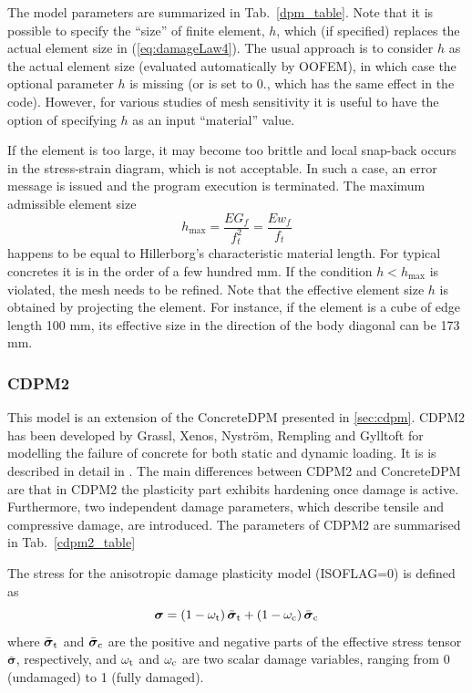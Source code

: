 \documentclass[a4paper]{article}
\begin{document}
The model parameters are summarized
in Tab.~\ref{dpm_table}. Note that it is possible to specify the ``size'' of finite element, $h$, which (if specified) replaces
the actual element size in  (\ref{eq:damageLaw4}). The usual approach is to consider $h$ as the actual element size (evaluated automatically by OOFEM), 
in which case the optional
parameter $h$ is missing (or is set to 0., which has the same effect in the code). However, for various studies of mesh sensitivity
it is useful to have the option of  specifying $h$ as an input ``material'' value.

If the element is too large, it may become too brittle and local snap-back
occurs in the stress-strain diagram, which is not acceptable. 
In such a case, an error message is issued and the program execution
is terminated. The maximum admissible element size 
\begin{equation}
h_{\max} = \frac{EG_f}{f_t^2} = \frac{Ew_f}{f_t}
\end{equation}
happens to be equal to Hillerborg's characteristic material length. 
For typical concretes it is in the order of a few hundred mm. 
If the condition $h<h_{\max}$ is violated, the mesh needs to be refined.
Note that the effective element size $h$ is obtained by projecting the element.
For instance, if the element is a cube of edge length 100 mm, its effective
size in the direction of the body diagonal can be 173 mm. 

\subsubsection{CDPM2}

This model is an extension of the ConcreteDPM presented in \ref{sec:cdpm}.
CDPM2 has been developed by Grassl, Xenos, Nystr\"{o}m, Rempling and Gylltoft for modelling the failure of concrete for both static and dynamic loading. It is is described in detail in \cite{GraXenNys13}.
The main differences between CDPM2 and ConcreteDPM are that in CDPM2 the plasticity part exhibits hardening once damage is active. Furthermore, two independent damage parameters, which describe tensile and compressive damage, are introduced.
The parameters of CDPM2 are summarised in Tab.~\ref{cdpm2_table}

The stress for the anisotropic damage plasticity model (ISOFLAG=0) is defined as
\begin{equation}
\boldsymbol{\sigma} = \left(1-\omega_{\rm t}\right) \bar{\boldsymbol{\sigma}}_{\rm t} + \left(1-\omega_{\rm c}\right) \bar{\boldsymbol{\sigma}}_{\rm c}
\end{equation}
where $\bar{\boldsymbol{\sigma}}_{\rm t}$ and $\bar{\boldsymbol{\sigma}}_{\rm c}$ are the positive and negative parts of the effective stress tensor $\bar{\boldsymbol{\sigma}}$, respectively, and $\omega_{\rm t}$ and $\omega_{\rm c}$ are two scalar damage variables, ranging from 0 (undamaged) to 1 (fully damaged).
\end{document}
